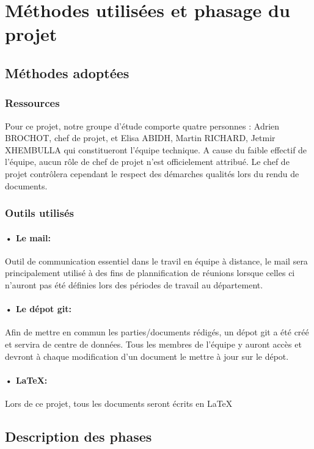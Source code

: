\section{Méthodes utilisées et phasage du projet}

\subsection{Méthodes adoptées}
\subsubsection{Ressources}
Pour ce projet, notre groupe d'étude comporte quatre personnes : Adrien BROCHOT, chef de projet, et Elisa ABIDH, Martin RICHARD, Jetmir XHEMBULLA qui constitueront l'équipe technique. A cause du faible effectif de l'équipe, aucun rôle de chef de projet n'est officielement attribué. Le chef de projet contrôlera cependant le respect des démarches qualités lors du rendu de documents.

\subsubsection{Outils utilisés}
\paragraph*{• Le mail:}Outil de communication essentiel dans le travil en équipe à distance, le mail sera principalement utilisé à des fins de plannification de réunions lorsque celles ci n'auront pas été définies lors des périodes de travail au département.

\paragraph*{• Le dépot git:}Afin de mettre en commun les parties/documents rédigés, un dépot git a été créé et servira de centre de données. Tous les membres de l'équipe y auront accès et devront à chaque modification d'un document le mettre à jour sur le dépot.

\paragraph*{• LaTeX:}Lors de ce projet, tous les documents seront écrits en LaTeX

\subsection{Description des phases}

